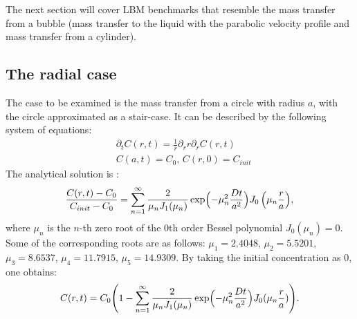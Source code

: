 \documentclass[preprint,12pt]{elsarticle}
\newcommand{\beq}{\begin{equation}}
\newcommand{\feq}{\end{equation}}
\begin{document}
The next section will cover LBM benchmarks that resemble the mass transfer from a bubble 
(mass transfer to the liquid with the parabolic velocity profile  and mass transfer from a cylinder).

\subsection{The radial case}
The case to be examined  is the mass transfer from a circle with radius $a$, with the circle approximated as a stair-case. It
can be described by the following system of equations:
\beq
\begin{aligned}
&\partial_t C(r,t)=\frac{1}{r}\partial_r r \partial_r C(r,t)\\
&C(a,t)=C_0,\,C(r,0)=C_{init}
\end{aligned}
\feq 
The analytical solution is \cite{chemical-correlations}:
\beq
\frac{C(r,t)-C_{0}}{C_{init}-C_{0}}=\sum_{n=1}^{\infty}{\frac{2}{\mu_n
J_1(\mu_n)}\exp\Bigl(-\mu_n^2 \frac{D t}{a^2} \Bigr)J_0\left(\mu_n \frac{r}{a}\right)},
\feq
where $\mu_n$ is the $n$-th zero root of the $0$th order Bessel polynomial $J_0(\mu_n)=0$. Some of
the corresponding roots are as follows: $\mu_1=2.4048$, $\mu_2=5.5201$, $\mu_3=8.6537$,
$\mu_4=11.7915$, $\mu_5=14.9309$.
By taking the initial concentration as $0$, one obtains:
\beq
\label{eq:analytical:profile:radial:case}
C(r,t)=C_0 \Biggl(1 - \sum_{n=1}^{\infty}{\frac{2}{\mu_n
J_1(\mu_n)}\exp\Bigl(-\mu_n^2 \frac{D t}{a^2} \Bigr)J_0(\mu_n \frac{r}{a})}\Biggr).
\feq
\end{document}
